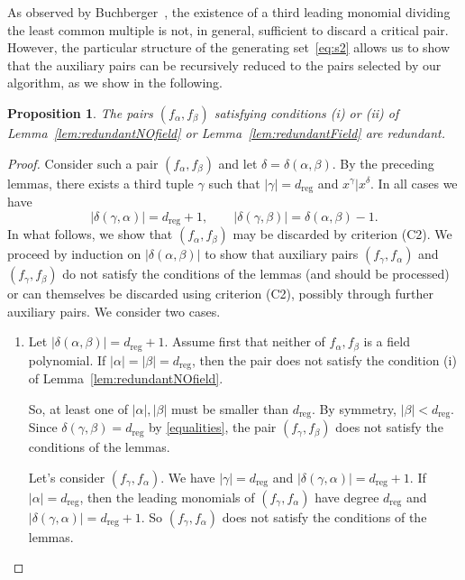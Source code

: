 \documentclass[a4paper, 12pt, oneside, openright]{article}
\newtheorem{prop}{Proposition}
\begin{document}
As observed by Buchberger~\cite{B79}, the existence of a third leading monomial dividing the least common multiple is not, in general, sufficient to discard a critical pair. However, the particular structure of the generating set~\eqref{eq:s2} allows us to show that the auxiliary pairs can be recursively reduced to the pairs selected by our algorithm, as we show in the following.

\begin{prop}\label{prop:redundant}
The pairs $(f_\alpha,f_\beta)$ satisfying conditions (i) or (ii) of Lemma~\ref{lem:redundantNOfield} or Lemma~\ref{lem:redundantField} are redundant.
\end{prop}
\begin{proof}
Consider such a pair $(f_\alpha,f_\beta)$ and let $\delta=\delta(\alpha,\beta)$. By the preceding lemmas, there exists a third tuple $\gamma$ such that $|\gamma|=d_{\mathrm{reg}}$ and $x^{\gamma}|x^{\delta}$. In all cases we have
\begin{equation}\label{equalities}
|\delta(\gamma,\alpha)|=d_{\mathrm{reg}}+1,
\qquad
|\delta(\gamma,\beta)|=\delta(\alpha,\beta)-1.
\end{equation}
In what follows, we show that  $(f_\alpha,f_\beta)$ may be discarded  by criterion (C2). We proceed by induction on $|\delta(\alpha,\beta)|$ to show that auxiliary pairs $(f_\gamma,f_\alpha)$ and $(f_\gamma,f_\beta)$ do not satisfy the conditions of the lemmas (and should be processed) or can themselves be discarded using criterion (C2), possibly through further auxiliary pairs.
We consider two cases.
\begin{enumerate}
\item  Let $|\delta(\alpha,\beta)|=d_{\mathrm{reg}}+1$. Assume first that neither of $f_\alpha,f_\beta$ is a field polynomial. If $|\alpha|=|\beta|=d_{\mathrm{reg}}$, then the pair does not satisfy the condition (i) of Lemma~\ref{lem:redundantNOfield}.  

So, at least one of $|\alpha|,|\beta|$ must be smaller than $d_{\mathrm{reg}}$. By symmetry,  $|\beta|<d_{\mathrm{reg}}$.
Since $\delta(\gamma,\beta)=d_{\mathrm{reg}}$ by \eqref{equalities}, the pair $(f_\gamma,f_\beta)$ does not satisfy the conditions of the lemmas.

Let's  consider $(f_\gamma,f_\alpha)$. We have $|\gamma|=d_{\mathrm{reg}}$ and $|\delta(\gamma,\alpha)|=d_{\mathrm{reg}}+1$.
If $|\alpha|=d_{\mathrm{reg}}$, then the leading monomials of  $(f_\gamma,f_\alpha)$  have degree $d_{\mathrm{reg}}$ and  $|\delta(\gamma,\alpha)|=d_{\mathrm{reg}}+1$. So $(f_\gamma,f_\alpha)$  does not satisfy the conditions of the lemmas.



\end{enumerate}
\end{proof}
\end{document}
